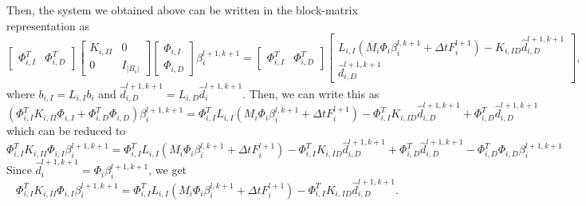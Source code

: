 \documentclass[a4paper, 11pt]{article}
\theoremstyle{plain}
\theoremstyle{definition}
\theoremstyle{remark}
\begin{document}
Then, the system we obtained above can be written in the block-matrix representation as 
\begin{equation*}
    \begin{bmatrix}
        \Phi_{i, I}^{T} & \Phi_{i, D}^{T}
    \end{bmatrix}
    \begin{bmatrix}
        K_{i, II} & 0\\
        0 & I_{\lvert B_{i}\rvert}
    \end{bmatrix}
    \begin{bmatrix}
        \Phi_{i, I}\\
        \Phi_{i, D}
    \end{bmatrix}
    \beta_{i}^{l+1, k+1}
    =
    \begin{bmatrix}
        \Phi_{i, I}^{T} & \Phi_{i, D}^{T}
    \end{bmatrix}
    \begin{bmatrix}
        L_{i, I}\left(M_{i}\Phi_{i}\beta_{i}^{l, k+1} + \Delta t F_{i}^{l+1}\right) - K_{i, ID}\hat{d}^{l+1, k+1}_{i, D}\\
        \hat{d}^{l+1, k+1}_{i, D}
    \end{bmatrix},
\end{equation*}
where $b_{i, I} = L_{i, I}b_{i}$ and $\hat{d}^{l+1, k+1}_{i, D} = L_{i, D}\hat{d}^{l+1, k+1}_{i}$. Then, we can write this as
\begin{equation*}
    \left(\Phi_{i, I}^{T}K_{i, II}\Phi_{i, I} + \Phi_{i, D}^{T}\Phi_{i, D}\right)\beta_{i}^{l+1, k+1} = \Phi_{i, I}^{T}L_{i, I}\left(M_{i}\Phi_{i}\beta_{i}^{l, k+1} + 
    \Delta t F_{i}^{l+1}\right) - \Phi_{i, I}^{T}K_{i, ID}\hat{d}^{l+1, k+1}_{i, D} + \Phi_{i, D}^{T}\hat{d}^{l+1, k+1}_{i, D}
\end{equation*}
which can be reduced to
\begin{equation*}
    \Phi_{i, I}^{T}K_{i, II}\Phi_{i, I} \beta_{i}^{l+1, k+1} = \Phi_{i, I}^{T}L_{i, I}\left(M_{i}\Phi_{i}\beta_{i}^{l, k+1} + 
    \Delta t F_{i}^{l+1}\right) - \Phi_{i, I}^{T}K_{i, ID}\hat{d}^{l+1, k+1}_{i, D} + \Phi_{i, D}^{T}\hat{d}^{l+1, k+1}_{i, D} - \Phi_{i, D}^{T}\Phi_{i, D}\beta_{i}^{l+1, k+1}
\end{equation*}
Since $\hat{d}^{l+1, k+1}_{i} = \Phi_{i}\beta_{i}^{l+1, k+1}$, we get
\begin{equation*}
    \Phi_{i, I}^{T}K_{i, II}\Phi_{i, I} \beta_{i}^{l+1, k+1} = \Phi_{i, I}^{T}L_{i, I}\left(M_{i}\Phi_{i}\beta_{i}^{l, k+1} + 
    \Delta t F_{i}^{l+1}\right) - \Phi_{i, I}^{T}K_{i, ID}\hat{d}^{l+1, k+1}_{i, D}.
\end{equation*}
\end{document}
